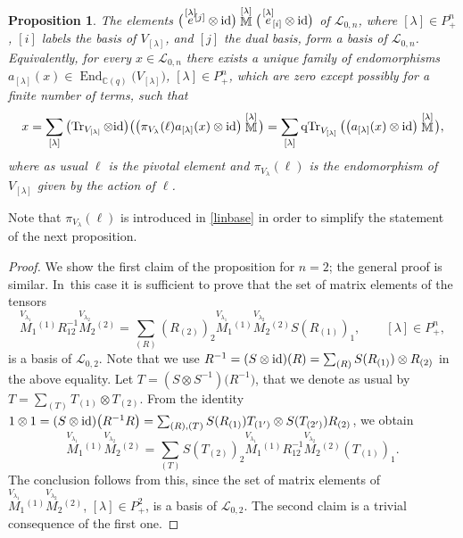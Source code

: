 \documentclass[pdftex]{sigma}%
\numberwithin{equation}{section}
\numberwithin{figure}{section}
\newtheorem{prop}[teo]{Proposition}
\newcommand{\mc}{\mathbb{C}}
\newcommand{\Ll}{{\mathcal L}}
\begin{document}
\begin{prop}\label{canonicform}
The elements $ \big(\!\stackrel{[\lambda]}{e}{}^{\!\!\! [j]}\otimes {\rm id} \big)\stackrel{[\lambda]}{\mathbb M}\big(\!\stackrel{[\lambda]}{e}{}_{\!\!\! [i]} \otimes {\rm id} \big)$ of $\Ll_{0,n}$, where $[\lambda] \in P_+^n$, $[i]$ labels the basis of $V_{[\lambda]}$, and $[j]$ the dual basis, form a basis of $\Ll_{0,n}$. Equivalently, for every $x\in \Ll_{0,n}$ there exists a unique family of endomorphisms $a_{[\lambda]}(x)\in \operatorname{End}_{\mc(q)}\big(V_{[\lambda]}\big)$, $[\lambda]\in P_+^n$, which are zero except possibly for a finite number of terms, such that
\begin{equation}\label{linbase}
x=\sum_{[\lambda]}\big(\!\operatorname{Tr}_{{V_{[\lambda]}}}\otimes {\rm id} \big)\big(\big(\pi_{V_{\lambda}}(\ell)a_{[\lambda]}(x)\otimes {\rm id} \big)\stackrel{[\lambda]}{\mathbb M}\!\big)=\sum_{[\lambda]}\operatorname{qTr}_{{V_{[\lambda]}}}\big(\big(a_{[\lambda]}(x)\otimes {\rm id} \big)\stackrel{[\lambda]}{\mathbb M}\!\big),
\end{equation}
where as usual $\ell$ is the pivotal element and $\pi_{V_{\lambda}}(\ell)$ is the endomorphism of $V_{[\lambda]}$ given by the action of $\ell$.
\end{prop}
Note that $\pi_{V_{\lambda}}(\ell)$ is introduced in \eqref{linbase} in order to simplify the statement of the next proposition.
\begin{proof} We show the first claim of the proposition for $n=2$; the general proof is similar. In~this case it is sufficient to prove that the set of matrix elements of the tensors
\[
\stackrel{V_{\lambda_1}}{M}_1{}^{\!\!\! (1)}R_{12}^{-1}\stackrel{V_{\lambda_2}}{M}_2{}^{\!\!\! (2)}=\sum_{(R)}(R_{(2)})_2\stackrel{V_{\lambda_1}}{M}_1{}^{\!\!\! (1)}\stackrel{V_{\lambda_2}}{M}_2{}^{\!\!\! (2)}S(R_{(1)})_1,\qquad [\lambda]\in P_+^n,
\]
is a basis of $\Ll_{0,2}$. Note that we use $\textstyle R^{-1}=(S \otimes {\rm id} )(R)=\sum_{(R)}S(R_{(1)}) \otimes R_{(2)}$ in the above equality. Let $T=( S\otimes S^{-1})\big(R^{-1}\big)$, that we denote as usual by $\textstyle T=\sum_{(T)}T_{(1)} \otimes T_{(2)}$. From the identity $1 \otimes 1 = ( S \otimes {\rm id} )\big(R^{-1}R\big) = \sum_{(R),(T)} S(R_{(1)})T_{(1')}\otimes S(T_{(2') })R_{(2)}$, we obtain
\[
\stackrel{V_{\lambda_1}}{M}_1{}^{\!\!\! (1)}\stackrel{V_{\lambda_2}}{M}_2{}^{\!\!\! (2)}=\sum_{(T)} S(T_{(2)})_2\stackrel{V_{\lambda_1}}{M}_1{}^{\!\!\! (1)}R_{12}^{-1}\stackrel{V_{\lambda_2}}{M}_2{}^{\!\!\! (2)}(T_{(1)})_1.
\]
The conclusion follows from this, since the set of matrix elements of $\stackrel{V_{\lambda_1}}{M}_1{}^{\!\!\! (1)}\stackrel{V_{\lambda_2}}{M}_2{}^{\!\!\! (2)}$, $[\lambda]\in P_+^2$, is a basis of $\Ll_{0,2}$. The second claim is a trivial consequence of the first one. \end{proof}
\end{document}
